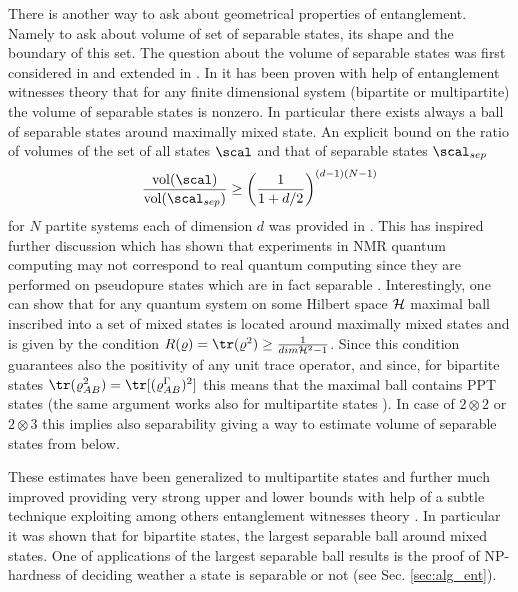 \documentclass[rmp,12pt,preprint]{revtex4-2}
\begin{document}
There is another way to ask about geometrical properties of
entanglement. Namely to ask about volume of set of separable states,
its shape and the boundary of this set. The question about the volume
of separable states was first considered in \cite{ZyczkowskiHSP-vol}
and extended in \cite{volume1}. In \cite{ZyczkowskiHSP-vol} it has
been proven with help of entanglement witnesses theory that for any
finite dimensional system (bipartite or multipartite) the volume of
separable states is nonzero. In particular there exists always a ball
of separable states around maximally mixed state. An explicit bound on
the ratio of volumes of the set of all states $\scal$ and that of
separable states $\scal_{sep}$
\begin{equation}
{\mathrm{vol}(\scal)\over \mathrm{vol}(\scal_{sep})}\geq \left({1\over 1+d/2}\right)^{(d-1)(N-1)}
\end{equation}
for $N$ partite systems each of dimension $d$ was provided in
\cite{VidalT1998-robustness}.  This has inspired further discussion
which has shown that experiments in NMR quantum computing may not
correspond to real quantum computing since they are performed on
pseudopure states which are in fact separable
\cite{BraunsteinCJLS1998-nmr}. Interestingly, one can show
\cite{ZyczkowskiHSP-vol,volume2} that for any quantum system on some
Hilbert space ${\cal H}$ maximal ball inscribed into a set of mixed
states is located around maximally mixed states and is given by the
condition $R(\varrho)={\tr}(\varrho^{2})\geq \frac{1}{dim{\cal H}^{2}
  -1}$. Since this condition guarantees also the positivity of any
unit trace operator, and since, for bipartite states
${\tr}(\varrho_{AB}^{2})={\tr}[(\varrho_{AB}^{\Gamma})^{2}]$ this
means that the maximal ball contains PPT states (the same argument
works also for multipartite states \cite{volume2}). In case of $2
\otimes 2$ or $2\otimes 3$ this implies also separability giving a way
to estimate volume of separable states from below.

These estimates have been generalized to multipartite states
\cite{BraunsteinCJLS1998-nmr} and further much improved providing very
strong upper and lower bounds with help of a subtle technique
exploiting among others entanglement witnesses theory
\cite{Gurvits1,Gurvits2,Gurvits3}.  In particular it was shown that
for bipartite states, the largest separable ball around mixed
states. One of applications of the largest separable ball results is
the proof of NP-hardness of deciding weather a state is separable or
not \cite{GurvitzNPHard} (see Sec. \ref{sec:alg_ent}).
\end{document}
